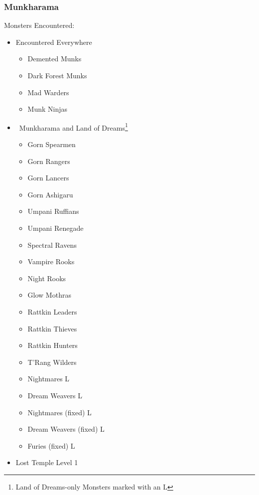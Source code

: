 \documentclass[12pt]{article}
\providecommand{\tightlist}{%
  \setlength{\itemsep}{0pt}\setlength{\parskip}{0pt}}
\begin{document}
\subsubsection{Munkharama}\label{munkharama}

Monsters Encountered:

\begin{multicols}{2}
\begin{itemize}
\item Encountered Everywhere

\begin{itemize}
\tightlist
\item
  Demented Munks
\item
  Dark Forest Munks
\item
  Mad Warders
\item
  Munk Ninjas
\end{itemize}

\item {\RaggedRight\ Munkharama and Land of Dreams\protect\footnote{Land of Dreams-only
    Monsters marked with an L}}

\begin{itemize}
\tightlist
\item
  Gorn Spearmen
\item
  Gorn Rangers
\item
  Gorn Lancers
\item
  Gorn Ashigaru
\item
  Umpani Ruffians
\item
  Umpani Renegade
\item
  Spectral Ravens
\item
  Vampire Rooks
\item
  Night Rooks
\item
  Glow Mothras
\item
  Rattkin Leaders
\item
  Rattkin Thieves
\item
  Rattkin Hunters
\item
  T'Rang Wilders
\item
  Nightmares L
\item
  Dream Weavers L
\item
  Nightmares (fixed) L
\item
  Dream Weavers (fixed) L
\item
  Furies (fixed) L
\end{itemize}

\item Lost Temple Level 1


\end{itemize}
\end{multicols}
\end{document}
